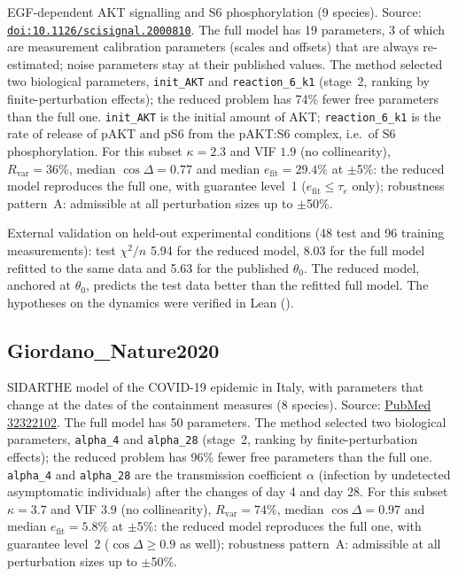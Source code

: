 EGF-dependent AKT signalling and S6 phosphorylation (9 species). Source: \href{https://doi.org/10.1126/scisignal.2000810}{\nolinkurl{doi:10.1126/scisignal.2000810}}. The full model has 19 parameters, 3 of which are measurement calibration parameters (scales and offsets) that are always re-estimated; noise parameters stay at their published values. The method selected two biological parameters, \texttt{init\_AKT} and \texttt{reaction\_6\_k1} (stage~2, ranking by finite-perturbation effects); the reduced problem has 74\% fewer free parameters than the full one. \texttt{init\_AKT} is the initial amount of AKT; \texttt{reaction\_6\_k1} is the rate of release of pAKT and pS6 from the pAKT:S6 complex, i.e.\ of S6 phosphorylation. For this subset $\kappa=2.3$ and VIF $1.9$ (no collinearity), $R_{\mathrm{var}}=36\%$, median $\cos\Delta=0.77$ and median $e_{\mathrm{fit}}=29.4\%$ at $\pm$5\%: the reduced model reproduces the full one, with guarantee level~1 ($e_{\mathrm{fit}}\le\tau_e$ only); robustness pattern~A: admissible at all perturbation sizes up to $\pm$50\%.

External validation on held-out experimental conditions (48 test and 96 training measurements): test $\chi^2/n$ 5.94 for the reduced model, 8.03 for the full model refitted to the same data and 5.63 for the published $\theta_0$. The reduced model, anchored at $\theta_0$, predicts the test data better than the refitted full model. The hypotheses on the dynamics were verified in Lean ().

\subsection*{Giordano\_Nature2020}

SIDARTHE model of the COVID-19 epidemic in Italy, with parameters that change at the dates of the containment measures (8 species). Source: \href{https://pubmed.ncbi.nlm.nih.gov/32322102/}{PubMed 32322102}. The full model has 50 parameters. The method selected two biological parameters, \texttt{alpha\_4} and \texttt{alpha\_28} (stage~2, ranking by finite-perturbation effects); the reduced problem has 96\% fewer free parameters than the full one. \texttt{alpha\_4} and \texttt{alpha\_28} are the transmission coefficient $\alpha$ (infection by undetected asymptomatic individuals) after the changes of day 4 and day 28. For this subset $\kappa=3.7$ and VIF $3.9$ (no collinearity), $R_{\mathrm{var}}=74\%$, median $\cos\Delta=0.97$ and median $e_{\mathrm{fit}}=5.8\%$ at $\pm$5\%: the reduced model reproduces the full one, with guarantee level~2 ($\cos\Delta\ge0.9$ as well); robustness pattern~A: admissible at all perturbation sizes up to $\pm$50\%.

